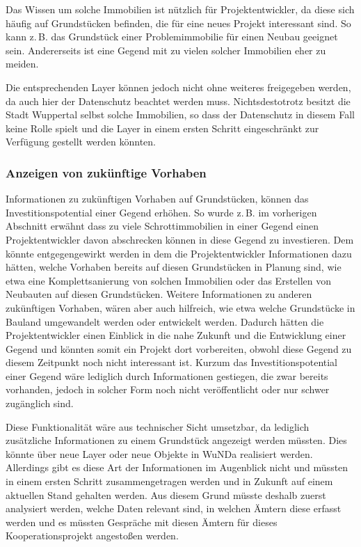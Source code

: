 Das Wissen um solche Immobilien ist nützlich für Projektentwickler, da diese sich häufig auf Grundstücken befinden, die für eine neues Projekt interessant sind.
So kann z.\,B. das Grundstück einer Problemimmobilie für einen Neubau geeignet sein.
Andererseits ist eine Gegend mit zu vielen solcher Immobilien eher zu meiden.

Die entsprechenden Layer können jedoch nicht ohne weiteres freigegeben werden, da auch hier  der Datenschutz beachtet werden muss.
Nichtsdestotrotz besitzt die Stadt Wuppertal selbst solche Immobilien, so dass der Datenschutz in diesem Fall keine Rolle spielt und die Layer in einem ersten Schritt eingeschränkt zur Verfügung gestellt werden könnten.
  
\subsubsection{Anzeigen von zukünftige Vorhaben}
Informationen zu zukünftigen Vorhaben auf Grundstücken, können das Investitionspotential einer Gegend erhöhen.
So wurde z.\,B. im vorherigen Abschnitt erwähnt dass zu viele Schrottimmobilien in einer Gegend einen Projektentwickler davon abschrecken können in diese Gegend zu investieren.
Dem könnte entgegengewirkt werden in dem die Projektentwickler Informationen dazu hätten, welche Vorhaben bereits auf diesen Grundstücken in Planung sind, wie etwa eine Komplettsanierung von solchen Immobilien oder das Erstellen von Neubauten auf diesen Grundstücken.
Weitere Informationen zu anderen zukünftigen Vorhaben, wären aber auch hilfreich, wie etwa welche Grundstücke in Bauland umgewandelt werden oder entwickelt werden. 
Dadurch hätten die Projektentwickler einen Einblick in die nahe Zukunft und die Entwicklung einer Gegend und könnten somit ein Projekt dort vorbereiten, obwohl diese Gegend zu diesem Zeitpunkt noch nicht interessant ist.
Kurzum das Investitionspotential einer Gegend wäre lediglich durch Informationen gestiegen, die zwar bereits vorhanden, jedoch in solcher Form noch nicht veröffentlicht oder nur schwer zugänglich sind.

Diese Funktionalität wäre aus technischer Sicht umsetzbar, da lediglich zusätzliche Informationen zu einem Grundstück angezeigt werden müssten.
Dies könnte über neue Layer oder neue Objekte in \ac{WuNDa} realisiert werden.
Allerdings gibt es diese Art der Informationen im Augenblick nicht und müssten in einem ersten Schritt zusammengetragen werden und in Zukunft auf einem aktuellen Stand gehalten werden.
Aus diesem Grund müsste deshalb zuerst analysiert werden, welche Daten relevant sind, in welchen Ämtern diese erfasst werden und es müssten Gespräche mit diesen Ämtern für dieses Kooperationsprojekt angestoßen werden.
 
